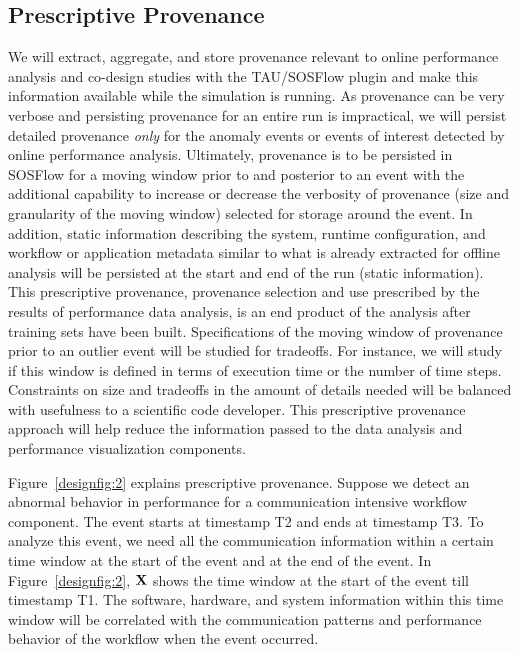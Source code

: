 \subsection{Prescriptive Provenance}
\label{subsection:features}
We will extract, aggregate, and store provenance relevant to online performance analysis and co-design studies with the TAU/SOSFlow plugin and make this information available while the simulation is running.  As provenance can be very verbose and persisting provenance for an entire run is impractical, we will persist detailed provenance {\em only} for the anomaly events or events of interest detected by online performance analysis.  Ultimately, provenance is to be persisted in SOSFlow for a moving window prior to and posterior to an event with the additional capability to increase or decrease the verbosity of provenance (size and granularity of the moving window) selected for storage around the event.  In addition, static information describing the system, runtime configuration, and  workflow or application metadata similar to what is already extracted for offline analysis will be persisted at the start and end of the run (static information).  This prescriptive provenance,  provenance selection and use prescribed by the results of performance data analysis, is an end product of the analysis after training sets have been built.
Specifications of the moving window of provenance prior to an outlier event will be studied for tradeoffs.  For instance, we will study if this window is defined in terms of execution time or the number of time steps.  Constraints on size and tradeoffs in the amount of details needed will be balanced with usefulness to a scientific code developer.
This prescriptive provenance approach will help reduce the information passed to the data analysis and performance visualization components.

Figure~\ref{designfig:2} explains prescriptive provenance. Suppose we detect an abnormal behavior in performance for a communication intensive workflow component. The event starts at timestamp T2 and ends at timestamp T3. To analyze this event, we need all the communication information within a certain time window at the start of the event and at the end of the event. In Figure~\ref{designfig:2}, ${\bf{X}}$ shows the time window at the start of the event till timestamp T1. The software, hardware, and system information within this time window will be correlated with the communication patterns and performance behavior of the workflow when the event occurred.


